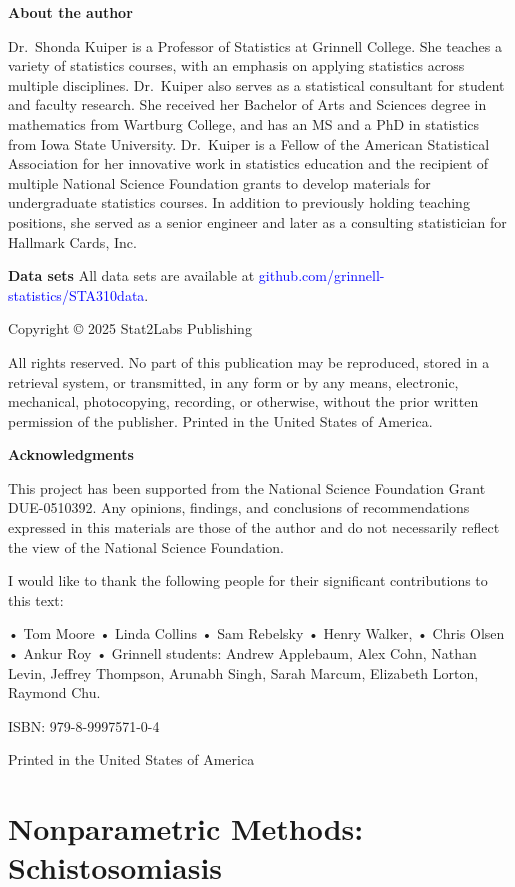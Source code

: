\documentclass[
]{report}
\begin{document}
\textbf{About the author}

Dr.~Shonda Kuiper is a Professor of Statistics at Grinnell College. She teaches a variety of statistics courses, with an emphasis on applying statistics across multiple disciplines. Dr.~Kuiper also serves as a statistical consultant for student and faculty research. She received her Bachelor of Arts and Sciences degree in mathematics from Wartburg College, and has an MS and a PhD in statistics from Iowa State University. Dr.~Kuiper is a Fellow of the American Statistical Association for her innovative work in statistics education and the recipient of multiple National Science Foundation grants to develop materials for undergraduate statistics courses. In addition to previously holding teaching positions, she served as a senior engineer and later as a consulting statistician for Hallmark Cards, Inc.

\textbf{Data sets}
All data sets are available at \textcolor{blue}{github.com/grinnell-statistics/STA310data}.

Copyright © 2025 Stat2Labs Publishing

All rights reserved. No part of this publication may be reproduced, stored in a retrieval system, or transmitted, in any form or by any means, electronic, mechanical, photocopying, recording, or otherwise, without the prior written permission of the publisher. Printed in the United States of America.

\textbf{Acknowledgments}

This project has been supported from the National Science Foundation Grant DUE-0510392. Any opinions, findings, and conclusions of recommendations expressed in this materials are those of the author and do not necessarily reflect the view of the National Science Foundation.

I would like to thank the following people for their significant contributions to this text:

• Tom Moore
• Linda Collins
• Sam Rebelsky
• Henry Walker,
• Chris Olsen
• Ankur Roy
• Grinnell students: Andrew Applebaum, Alex Cohn, Nathan Levin, Jeffrey Thompson,
Arunabh Singh, Sarah Marcum, Elizabeth Lorton, Raymond Chu.

ISBN: 979-8-9997571-0-4

Printed in the United States of America

\newpage

\hypertarget{nonparametric-methods-schistosomiasis}{%
\chapter{Nonparametric Methods: Schistosomiasis}\label{nonparametric-methods-schistosomiasis}}
\end{document}
